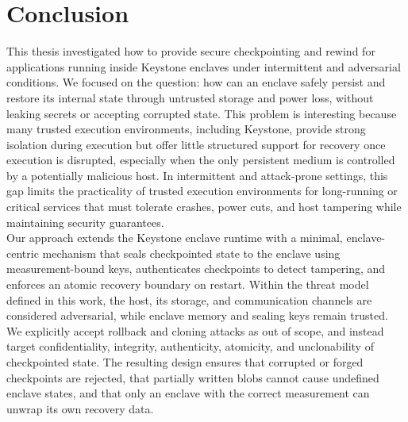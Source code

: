 \documentclass[11pt,a4paper]{report}
\begin{document}
\chapter{Conclusion}
\label{chap:conclusion}

This thesis investigated how to provide secure checkpointing and rewind for applications running inside Keystone enclaves under intermittent and adversarial conditions.  
We focused on the question: how can an enclave safely persist and restore its internal state through untrusted storage and power loss, without leaking secrets or accepting corrupted state.  
This problem is interesting because many trusted execution environments, including Keystone, provide strong isolation during execution but offer little structured support for recovery once execution is disrupted, especially when the only persistent medium is controlled by a potentially malicious host.  
In intermittent and attack-prone settings, this gap limits the practicality of trusted execution environments for long-running or critical services that must tolerate crashes, power cuts, and host tampering while maintaining security guarantees.  
\\

Our approach extends the Keystone enclave runtime with a minimal, enclave-centric mechanism that seals checkpointed state to the enclave using measurement-bound keys, authenticates checkpoints to detect tampering, and enforces an atomic recovery boundary on restart.  
Within the threat model defined in this work, the host, its storage, and communication channels are considered adversarial, while enclave memory and sealing keys remain trusted.  
We explicitly accept rollback and cloning attacks as out of scope, and instead target confidentiality, integrity, authenticity, atomicity, and unclonability of checkpointed state.  
The resulting design ensures that corrupted or forged checkpoints are rejected, that partially written blobs cannot cause undefined enclave states, and that only an enclave with the correct measurement can unwrap its own recovery data.  
\\
\end{document}
